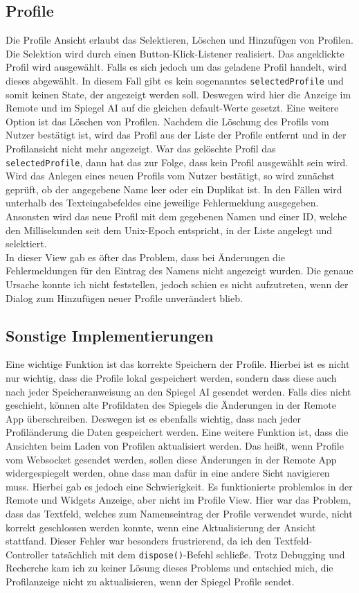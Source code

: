 \subsection{Profile}
Die Profile Ansicht erlaubt das Selektieren, Löschen und Hinzufügen von Profilen. Die Selektion wird durch einen Button-Klick-Listener realisiert. Das angeklickte Profil wird ausgewählt. Falls es sich jedoch um das geladene Profil handelt, wird dieses abgewählt. In diesem Fall gibt es kein sogenanntes \texttt{selectedProfile} und somit keinen State, der angezeigt werden soll. Deswegen wird hier die Anzeige im Remote und im Spiegel AI auf die gleichen default-Werte gesetzt. Eine weitere Option ist das Löschen von Profilen. Nachdem die Löschung des Profils vom Nutzer bestätigt ist, wird das Profil aus der Liste der Profile entfernt und in der Profilansicht nicht mehr angezeigt. War das gelöschte Profil das \texttt{selectedProfile}, dann hat das zur Folge, dass kein Profil ausgewählt sein wird. Wird das Anlegen eines neuen Profils vom Nutzer bestätigt, so wird zunächst geprüft, ob der angegebene Name leer oder ein Duplikat ist. In den Fällen wird unterhalb des Texteingabefeldes eine jeweilige Fehlermeldung ausgegeben. Ansonsten wird das neue Profil mit dem gegebenen Namen und einer ID, welche den Millisekunden seit dem Unix-Epoch entspricht, in der Liste angelegt und selektiert. \\
In dieser View gab es öfter das Problem, dass bei Änderungen die Fehlermeldungen für den Eintrag des Namens nicht angezeigt wurden. Die genaue Ursache konnte ich nicht feststellen, jedoch schien es nicht aufzutreten, wenn der Dialog zum Hinzufügen neuer Profile unverändert blieb.

\subsection{Sonstige Implementierungen}
Eine wichtige Funktion ist das korrekte Speichern der Profile. Hierbei ist es nicht nur wichtig, dass die Profile lokal gespeichert werden, sondern dass diese auch nach jeder Speicheranweisung an den Spiegel AI gesendet werden. Falls dies nicht geschieht, können alte Profildaten des Spiegels die Änderungen in der Remote App überschreiben. Deswegen ist es ebenfalls wichtig, dass nach jeder Profiländerung die Daten gespeichert werden. Eine weitere Funktion ist, dass die Ansichten beim Laden von Profilen aktualisiert werden. Das heißt, wenn Profile vom Websocket gesendet werden, sollen diese Änderungen in der Remote App widergespiegelt werden, ohne dass man dafür in eine andere Sicht navigieren muss. Hierbei gab es jedoch eine Schwierigkeit. Es funktionierte problemlos in der Remote und Widgets Anzeige, aber nicht im Profile View. Hier war das Problem, dass das Textfeld, welches zum Namenseintrag der Profile verwendet wurde, nicht korrekt geschlossen werden konnte, wenn eine Aktualisierung der Ansicht stattfand. Dieser Fehler war besonders frustrierend, da ich den Textfeld-Controller tatsächlich mit dem \texttt{dispose()}-Befehl schließe. Trotz Debugging und Recherche kam ich zu keiner Lösung dieses Problems und entschied mich, die Profilanzeige nicht zu aktualisieren, wenn der Spiegel Profile sendet.
